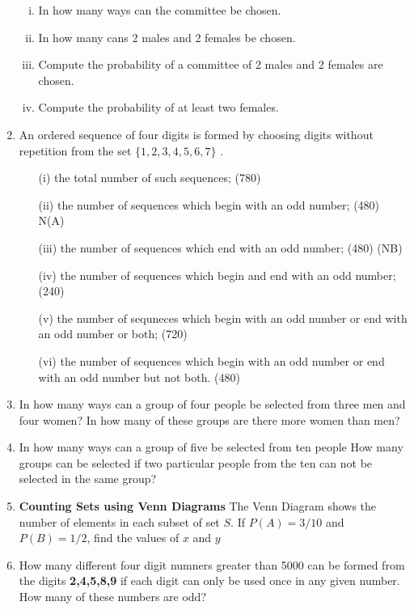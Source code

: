 \documentclass[a4paper,12pt]{article}
\begin{document}
\begin{enumerate}
\begin{enumerate}[(i)]
	\item In how many ways can the committee be chosen.
	\item In how many cans 2 males and 2 females be chosen.
	\item Compute the probability of a committee of 2 males and 2 females are chosen.
	\item Compute the probability of at least two females.
\end{enumerate}


\item 
An ordered sequence of four digits is formed by choosing digits without
repetition from the set $\{1, 2, 3, 4, 5, 6, 7\}$ .

\begin{itemize}
	\item[(i)] the total number of such sequences; (780)
	\item[(ii)] the number of sequences which begin with an odd number; (480) N(A)
	\item[(iii)] the number of sequences which end with an odd number; (480) (NB)
	\item[(iv)] the number of sequences which begin and end with an odd number;(240)
	\item[(v)] the number of sequneces which begin with an odd number or end with an
	odd number or both; (720)
	\item[(vi)] the number of sequences which begin with an odd number or end with an
	odd number but not both. (480)
\end{itemize}

\item In how many ways can a group of four people be selected from three men and four women?
In how many of these groups are there more women than men?
\item In how many ways can a group of five be selected from ten people
How many groups can be selected if two particular people from the ten can not be selected in the same group?\\


\item \textbf{Counting Sets using Venn Diagrams}
The Venn Diagram shows the number of elements in each subset of set $S$.
If $P(A) = 3/10$ and $P(B) = 1/2$, find the values of $x$ and $y$

\item How many different four digit numners greater than 5000 can be formed from the digits \textbf{2,4,5,8,9} if each digit can only be used once in any given number. How many of these numbers are odd?

\end{enumerate}
\end{document}
